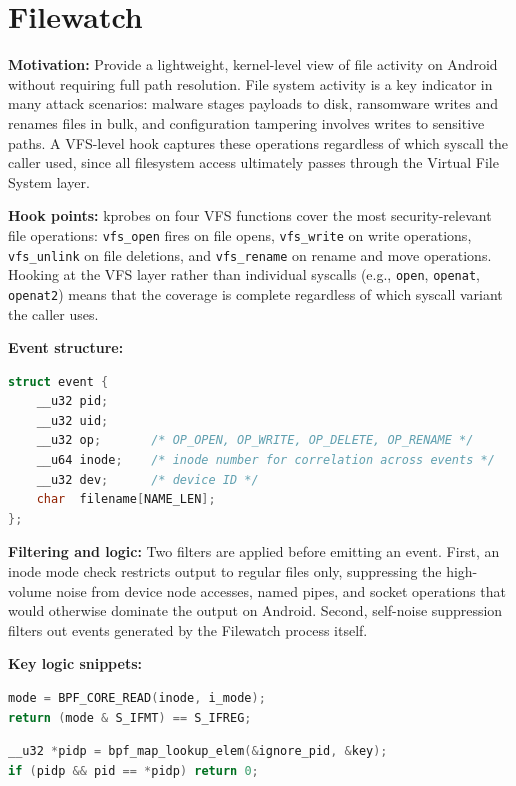 \documentclass{mnitjaipur}
\begin{document}
\section{Filewatch}
\textbf{Motivation:} Provide a lightweight, kernel-level view of file activity on Android without requiring full path resolution. File system activity is a key indicator in many attack scenarios: malware stages payloads to disk, ransomware writes and renames files in bulk, and configuration tampering involves writes to sensitive paths. A VFS-level hook captures these operations regardless of which syscall the caller used, since all filesystem access ultimately passes through the Virtual File System layer.

\textbf{Hook points:} kprobes on four VFS functions cover the most security-relevant file operations: \texttt{vfs\_open} fires on file opens, \texttt{vfs\_write} on write operations, \texttt{vfs\_unlink} on file deletions, and \texttt{vfs\_rename} on rename and move operations. Hooking at the VFS layer rather than individual syscalls (e.g., \texttt{open}, \texttt{openat}, \texttt{openat2}) means that the coverage is complete regardless of which syscall variant the caller uses.

\textbf{Event structure:}
\begin{lstlisting}[language=C,caption={Filewatch event structure}]
struct event {
    __u32 pid;
    __u32 uid;
    __u32 op;       /* OP_OPEN, OP_WRITE, OP_DELETE, OP_RENAME */
    __u64 inode;    /* inode number for correlation across events */
    __u32 dev;      /* device ID */
    char  filename[NAME_LEN];
};
\end{lstlisting}

\textbf{Filtering and logic:} Two filters are applied before emitting an event. First, an inode mode check restricts output to regular files only, suppressing the high-volume noise from device node accesses, named pipes, and socket operations that would otherwise dominate the output on Android. Second, self-noise suppression filters out events generated by the Filewatch process itself.

\textbf{Key logic snippets:}
\begin{lstlisting}[language=C,caption={Filewatch regular-file filter}]
mode = BPF_CORE_READ(inode, i_mode);
return (mode & S_IFMT) == S_IFREG;
\end{lstlisting}

\begin{lstlisting}[language=C,caption={Filewatch self-noise suppression}]
__u32 *pidp = bpf_map_lookup_elem(&ignore_pid, &key);
if (pidp && pid == *pidp) return 0;
\end{lstlisting}
\end{document}
